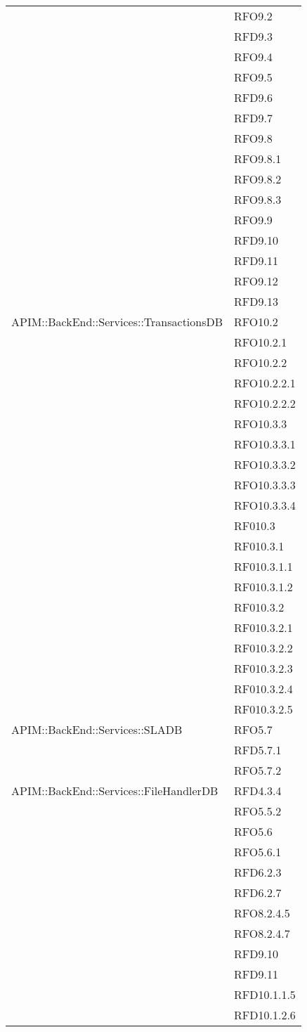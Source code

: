 \begin{longtable}{ p{12cm} | p{4cm} }
			& RFO9.2 \\
			& RFD9.3 \\
			& RFO9.4 \\
			& RFO9.5 \\
			& RFD9.6 \\
			& RFD9.7 \\
			& RFO9.8 \\
			& RFO9.8.1 \\
			& RFO9.8.2 \\
			& RFO9.8.3 \\
			& RFO9.9 \\
			& RFD9.10 \\
			& RFD9.11 \\
			& RFO9.12 \\
			& RFD9.13 \\
			\hline
			APIM::BackEnd::Services::TransactionsDB
			& RFO10.2 \\
			& RFO10.2.1 \\
			& RFO10.2.2 \\
			& RFO10.2.2.1 \\
			& RFO10.2.2.2 \\
			& RFO10.3.3 \\
			& RFO10.3.3.1 \\
			& RFO10.3.3.2 \\
			& RFO10.3.3.3 \\
			& RFO10.3.3.4 \\
			& RF010.3 \\
			& RF010.3.1 \\
			& RF010.3.1.1 \\
			& RF010.3.1.2 \\
			& RF010.3.2 \\
			& RF010.3.2.1 \\
			& RF010.3.2.2 \\
			& RF010.3.2.3 \\
			& RF010.3.2.4 \\
			& RF010.3.2.5 \\
			\hline
			APIM::BackEnd::Services::SLADB
			& RFO5.7 \\
			& RFD5.7.1 \\
			& RFO5.7.2 \\
			\hline
			APIM::BackEnd::Services::FileHandlerDB
			& RFD4.3.4 \\
			& RFO5.5.2 \\
			& RFO5.6 \\
			& RFO5.6.1 \\
			& RFD6.2.3 \\
			& RFD6.2.7 \\
			& RFO8.2.4.5 \\
			& RFO8.2.4.7 \\
			& RFD9.10 \\
			& RFD9.11 \\
			& RFD10.1.1.5 \\
			& RFD10.1.2.6 \\
			\hline
		    												
			\hline
		
		\end{longtable}
		
